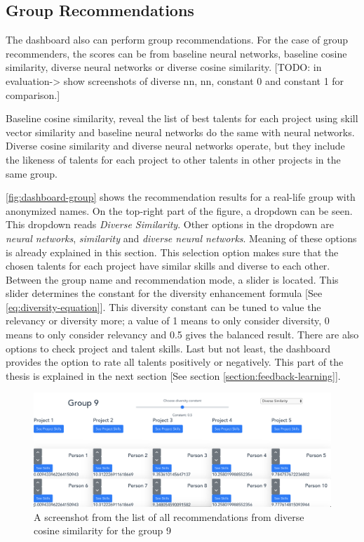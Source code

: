 \subsection{Group Recommendations}

The dashboard also can perform group recommendations. For the case of group recommenders, the scores can be from baseline neural networks, baseline cosine similarity, diverse neural networks or diverse cosine similarity. [TODO: in evaluation-> show screenshots of diverse nn, nn, constant 0 and constant 1 for comparison.]

Baseline cosine similarity, reveal the list of best talents for each project using skill vector similarity and baseline neural networks do the same with neural networks. Diverse cosine similarity and diverse neural networks operate, but they include the likeness of talents for each project to other talents in other projects in the same group.


\autoref{fig:dashboard-group} shows the recommendation results for a real-life group with anonymized names. On the top-right part of the figure, a dropdown can be seen. This dropdown reads \textit{Diverse Similarity}. Other options in the dropdown are \textit{neural networks}, \textit{similarity} and \textit{diverse neural networks}. Meaning of these options is already explained in this section. This selection option makes sure that the chosen talents for each project have similar skills and diverse to each other. Between the group name and recommendation mode, a slider is located. This slider determines the constant for the diversity enhancement formula [See \ref{eq:diversity-equation}]. This diversity constant can be tuned to value the relevancy or diversity more; a value of 1 means to only consider diversity, 0 means to only consider relevancy and 0.5 gives the balanced result. There are also options to check project and talent skills. Last but not least, the dashboard provides the option to rate all talents positively or negatively. This part of the thesis is explained in the next section [See section \ref{section:feedback-learning}].

 \begin{figure}[!ht]
	\centering
	\includegraphics[width=\textwidth]{figures/DashboardGroup.png}
	\caption{A screenshot from the list of all recommendations from diverse cosine similarity for the group 9}
	\label{fig:dashboard-group}
\end{figure}




